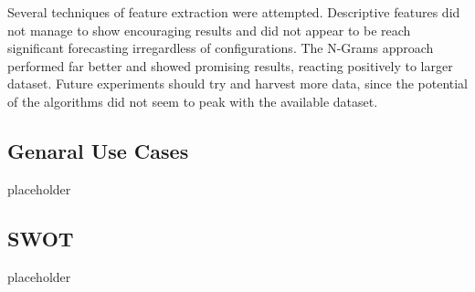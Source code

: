 	\par
	
	Several techniques of feature extraction were attempted. Descriptive features did not manage to show encouraging results and did not appear to be reach significant forecasting irregardless of configurations. The N-Grams approach performed far better and showed promising results, reacting positively to larger dataset. Future experiments should try and harvest more data, since the potential of the algorithms did not seem to peak with the available dataset.
	
	\subsection{Genaral Use Cases}
		{\color{red} \Large placeholder}
		
	\subsection{SWOT}
	{\color{red} \Large placeholder}